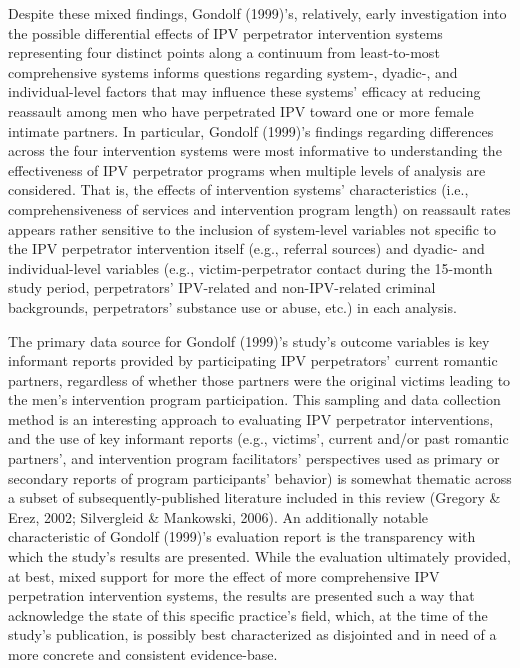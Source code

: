 \documentclass[11pt,]{tufte-book}
\begin{document}
Despite these mixed findings, Gondolf (1999)'s, relatively, early
investigation into the possible differential effects of IPV perpetrator
intervention systems representing four distinct points along a continuum
from least-to-most comprehensive systems informs questions regarding
system-, dyadic-, and individual-level factors that may influence these
systems' efficacy at reducing reassault among men who have perpetrated
IPV toward one or more female intimate partners. In particular, Gondolf
(1999)'s findings regarding differences across the four intervention
systems were most informative to understanding the effectiveness of IPV
perpetrator programs when multiple levels of analysis are considered.
That is, the effects of intervention systems' characteristics (i.e.,
comprehensiveness of services and intervention program length) on
reassault rates appears rather sensitive to the inclusion of
system-level variables not specific to the IPV perpetrator intervention
itself (e.g., referral sources) and dyadic- and individual-level
variables (e.g., victim-perpetrator contact during the 15-month study
period, perpetrators' IPV-related and non-IPV-related criminal
backgrounds, perpetrators' substance use or abuse, etc.) in each
analysis.

The primary data source for Gondolf (1999)'s study's outcome variables
is key informant reports provided by participating IPV perpetrators'
current romantic partners, regardless of whether those partners were the
original victims leading to the men's intervention program
participation. This sampling and data collection method is an
interesting approach to evaluating IPV perpetrator interventions, and
the use of key informant reports (e.g., victims', current and/or past
romantic partners', and intervention program facilitators' perspectives
used as primary or secondary reports of program participants' behavior)
is somewhat thematic across a subset of subsequently-published
literature included in this review (Gregory \& Erez, 2002; Silvergleid
\& Mankowski, 2006). An additionally notable characteristic of Gondolf
(1999)'s evaluation report is the transparency with which the study's
results are presented. While the evaluation ultimately provided, at
best, mixed support for more the effect of more comprehensive IPV
perpetration intervention systems, the results are presented such a way
that acknowledge the state of this specific practice's field, which, at
the time of the study's publication, is possibly best characterized as
disjointed and in need of a more concrete and consistent evidence-base.
\end{document}
